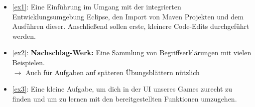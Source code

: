 \begin{itemize}
	\item \ref{ex1}: Eine Einführung im Umgang mit der integrierten Entwicklungsumgebung Eclipse, den Import von Maven Projekten und dem Ausführen dieser. Anschließend sollen erste, kleinere Code-Edits durchgeführt werden.
	\item \ref{ex2}: \textbf{Nachschlag-Werk:} Eine Sammlung von Begriffserklärungen mit vielen Beispielen.\\
	$\rightarrow$ Auch für Aufgaben auf späteren Übungsblättern nützlich
	\item \ref{ex3}: Eine kleine Aufgabe, um dich in der UI unseres Games zurecht zu finden und um zu lernen mit den bereitgestellten Funktionen umzugehen.
\end{itemize}
\newpage